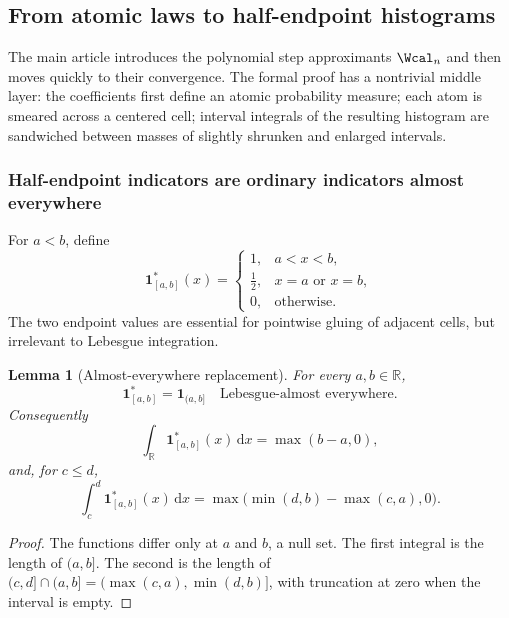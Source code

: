 \documentclass[11pt,oneside]{article}
\newtheorem{lemma}[theorem]{Lemma}
\theoremstyle{definition}
\theoremstyle{remark}
\newcommand{\R}{\mathbb R}
\newcommand{\dd}{\,\mathrm d}
\begin{document}
\subsection{From atomic laws to half-endpoint histograms}
\label{integration:sec:step-measure-bridge}

The main article introduces the polynomial step approximants $\Wcal_n$ and then moves quickly
to their convergence.  The formal proof has a nontrivial middle layer: the coefficients first
define an atomic probability measure; each atom is smeared across a centered cell; interval
integrals of the resulting histogram are sandwiched between masses of slightly shrunken and
enlarged intervals.

\subsubsection{Half-endpoint indicators are ordinary indicators almost everywhere}

For $a<b$, define
\begin{equation}
 \mathbf1_{[a,b]}^*(x)=
 \begin{cases}
  1,&a<x<b,\\
  \tfrac12,&x=a\text{ or }x=b,\\
  0,&\text{otherwise}.
 \end{cases}
 \label{integration:eq:half-endpoint-indicator}
\end{equation}
The two endpoint values are essential for pointwise gluing of adjacent cells, but irrelevant
to Lebesgue integration.

\begin{lemma}[Almost-everywhere replacement]
\label{integration:lem:half-indicator-ae}
For every $a,b\in\R$,
\begin{equation}
 \mathbf1_{[a,b]}^*=\mathbf1_{(a,b]}
 \quad\text{Lebesgue-almost everywhere}.
 \label{integration:eq:half-indicator-ae}
\end{equation}
Consequently
\begin{equation}
 \int_\R\mathbf1_{[a,b]}^*(x)\dd x=\max(b-a,0),
 \label{integration:eq:half-indicator-total-integral}
\end{equation}
and, for $c\le d$,
\begin{equation}
 \int_c^d\mathbf1_{[a,b]}^*(x)\dd x
 =\max\bigl(\min(d,b)-\max(c,a),0\bigr).
 \label{integration:eq:half-indicator-overlap}
\end{equation}
\end{lemma}

\begin{proof}
The functions differ only at $a$ and $b$, a null set.  The first integral is the length of
$(a,b]$.  The second is the length of
$(c,d]\cap(a,b]=(\max(c,a),\min(d,b)]$, with truncation at zero when the interval is empty.
\end{proof}
\end{document}

